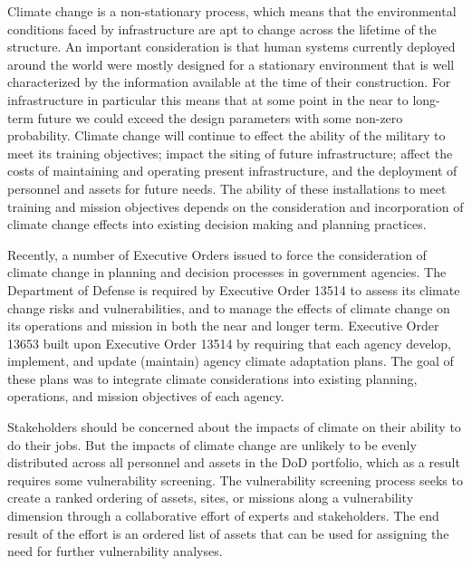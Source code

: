 \documentclass[10pt]{amsart}
\begin{document}
Climate change is a non-stationary process, which means that the environmental conditions faced by infrastructure are apt to change across the lifetime of the structure. 
An important consideration is that human systems currently deployed around the world were mostly designed for a stationary environment that is well characterized by the information available at the time of their construction.
For infrastructure in particular this means that at some point in the near to long-term future we could exceed the design parameters with some non-zero probability.
Climate change will continue to effect the ability of the military to meet its training objectives; impact the siting of future infrastructure; affect the costs of maintaining and operating present infrastructure, and the deployment of personnel and assets for future needs.
The ability of these installations to meet training and mission objectives depends on the consideration and incorporation of climate change effects into existing decision making and planning practices. 

Recently, a number of Executive Orders issued to force the consideration of climate change in planning and decision processes in government agencies. 
The Department of Defense is required by Executive Order 13514 to assess its climate change risks and vulnerabilities, and to manage the effects of climate change on its operations and mission in both the near and longer term. 
Executive Order 13653 built upon Executive Order 13514 by requiring that each agency develop, implement, and update (maintain) agency climate adaptation plans.
The goal of these plans was to integrate climate considerations into existing planning, operations, and mission objectives of each agency.

Stakeholders should be concerned about the impacts of climate on their ability to do their jobs. 
But the impacts of climate change are unlikely to be evenly distributed across all personnel and assets in the DoD portfolio, which as a result requires some vulnerability screening.
The vulnerability screening process seeks to create a ranked ordering of assets, sites, or missions along a vulnerability dimension through a collaborative effort of experts and stakeholders.
The end result of the effort is an ordered list of assets that can be used for assigning the need for further vulnerability analyses. 
\end{document}
